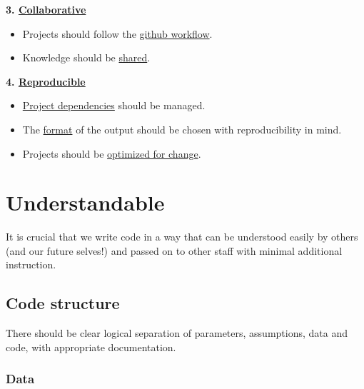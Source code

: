 \documentclass[]{book}
\providecommand{\tightlist}{%
  \setlength{\itemsep}{0pt}\setlength{\parskip}{0pt}}
\begin{document}
\textbf{3. \protect\hyperlink{collaborate}{Collaborative}}

\begin{itemize}
\tightlist
\item
  Projects should follow the \protect\hyperlink{versioncontrol}{github workflow}.
\item
  Knowledge should be \protect\hyperlink{knowledge}{shared}.
\end{itemize}

\textbf{4. \protect\hyperlink{reproduce}{Reproducible}}

\begin{itemize}
\tightlist
\item
  \protect\hyperlink{projdep}{Project dependencies} should be managed.
\item
  The \protect\hyperlink{format}{format} of the output should be chosen with reproducibility in mind.
\item
  Projects should be \protect\hyperlink{change}{optimized for change}.
\end{itemize}

\hypertarget{understand}{%
\chapter{Understandable}\label{understand}}

It is crucial that we write code in a way that can be understood easily by others (and our future selves!) and passed on to other staff with minimal additional instruction.

\hypertarget{structure2}{%
\section{Code structure}\label{structure2}}

There should be clear logical separation of parameters, assumptions, data and code, with appropriate documentation.

\hypertarget{data}{%
\subsection*{Data}\label{data}}
\end{document}
